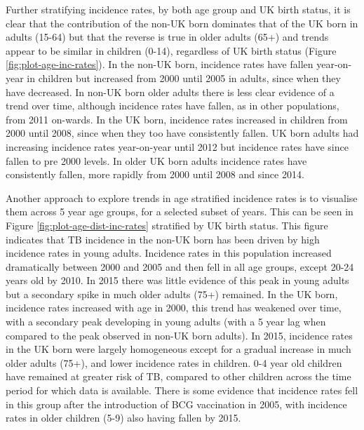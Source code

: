 \documentclass[11pt,twoside]{bristolthesis}
\begin{document}
  Further stratifying incidence rates, by both age group and UK birth status, it is clear that the contribution of the non-UK born dominates that of the UK born in adults (15-64) but that the reverse is true in older adults (65+) and trends appear to be similar in children (0-14), regardless of UK birth status (Figure \ref{fig:plot-age-inc-rates}). In the non-UK born, incidence rates have fallen year-on-year in children but increased from 2000 until 2005 in adults, since when they have decreased. In non-UK born older adults there is less clear evidence of a trend over time, although incidence rates have fallen, as in other populations, from 2011 on-wards. In the UK born, incidence rates increased in children from 2000 until 2008, since when they too have consistently fallen. UK born adults had increasing incidence rates year-on-year until 2012 but incidence rates have since fallen to pre 2000 levels. In older UK born adults incidence rates have consistently fallen, more rapidly from 2000 until 2008 and since 2014.
  
  Another approach to explore trends in age stratified incidence rates is to visualise them across 5 year age groups, for a selected subset of years. This can be seen in Figure \ref{fig:plot-age-dist-inc-rates} stratified by UK birth status. This figure indicates that TB incidence in the non-UK born has been driven by high incidence rates in young adults. Incidence rates in this population increased dramatically between 2000 and 2005 and then fell in all age groups, except 20-24 years old by 2010. In 2015 there was little evidence of this peak in young adults but a secondary spike in much older adults (75+) remained. In the UK born, incidence rates increased with age in 2000, this trend has weakened over time, with a secondary peak developing in young adults (with a 5 year lag when compared to the peak observed in non-UK born adults). In 2015, incidence rates in the UK born were largely homogeneous except for a gradual increase in much older adults (75+), and lower incidence rates in children. 0-4 year old children have remained at greater risk of TB, compared to other children across the time period for which data is available. There is some evidence that incidence rates fell in this group after the introduction of BCG vaccination in 2005, with incidence rates in older children (5-9) also having fallen by 2015.
  
\end{document}
